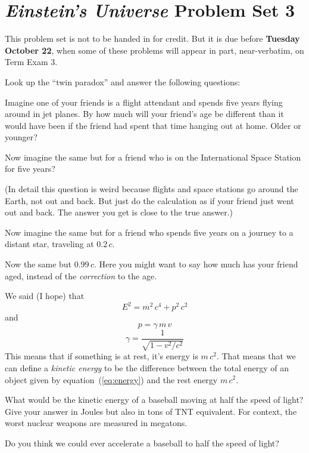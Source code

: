 \documentclass[12pt, letterpaper]{article}
\begin{document}
\section*{\textsl{Einstein's Universe} Problem Set 3}

This problem set is not to be handed in for credit. But it is due
before \textbf{Tuesday October 22}, when some of these problems
will appear in part, near-verbatim, on Term Exam 3.

\begin{problem}
Look up the ``twin paradox'' and answer the following questions:

Imagine one of your friends is a flight attendant and spends five years
flying around in jet planes. By how much will your friend's age be different
than it would have been if the friend had spent that time hanging out
at home. Older or younger?

Now imagine the same but for a friend who is on the International
Space Station for five years?

(In detail this question is weird because flights and space stations
go around the Earth, not out and back. But just do the calculation as
if your friend just went out and back. The answer you get is close to
the true answer.)

Now imagine the same but for a friend who spends five years on a journey
to a distant star, traveling at $0.2\,c$.

Now the same but $0.99\,c$. Here you might want to say how much has your
friend aged, instead of the \emph{correction} to the age.
\end{problem}

\begin{problem}
We said (I hope) that
\begin{equation}\label{eq:energy}
E^2 = m^2\,c^4 + p^2\,c^2
\end{equation}
and
\begin{equation}
p = \gamma\,m\,v
\end{equation}
\begin{equation}
\gamma = \frac{1}{\sqrt{1 - v^2/c^2}}
\end{equation}
This means that if something is at rest, it's energy is $m\,c^2$. That
means that we can define a \emph{kinetic energy} to be the difference
between the total energy of an object given by
equation~(\ref{eq:energy}) and the rest energy $m\,c^2$.

What would be the kinetic energy of a baseball moving at half the
speed of light? Give your answer in Joules but also in tons of TNT
equivalent. For context, the worst nuclear weapons are measured in
megatons.

Do you think we could ever accelerate a baseball to half the speed of
light?
\end{problem}
\end{document}
